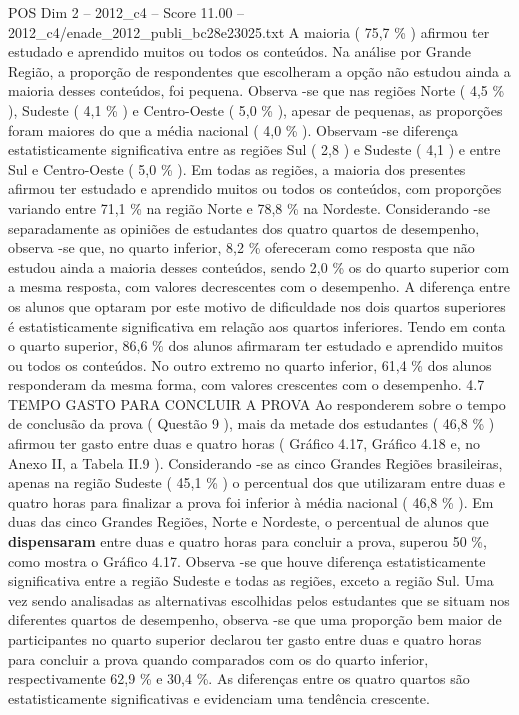 \begin{textsample}{POS Dim 2 – 2012\_c4 – Score 11.00 – 2012\_c4/enade\_2012\_publi\_bc28e23025.txt}
A maioria ( 75,7 \% ) afirmou ter estudado e aprendido muitos ou todos os conteúdos.
Na análise por Grande Região, a proporção de respondentes que escolheram a opção não estudou ainda a maioria desses conteúdos, foi pequena.
Observa -se que nas regiões Norte ( 4,5 \% ), Sudeste ( 4,1 \% ) e Centro-Oeste ( 5,0 \% ), apesar de pequenas, as proporções foram maiores do que a média nacional ( 4,0 \% ).
Observam -se diferença estatisticamente significativa entre as regiões Sul ( 2,8 ) e Sudeste ( 4,1 ) e entre Sul e Centro-Oeste ( 5,0 \% ).
Em todas as regiões, a maioria dos presentes afirmou ter estudado e aprendido muitos ou todos os conteúdos, com proporções variando entre 71,1 \% na região Norte e 78,8 \% na Nordeste.
Considerando -se separadamente as opiniões de estudantes dos quatro quartos de desempenho, observa -se que, no quarto inferior, 8,2 \% ofereceram como resposta que não estudou ainda a maioria desses conteúdos, sendo 2,0 \% os do quarto superior com a mesma resposta, com valores decrescentes com o desempenho.
A diferença entre os alunos que optaram por este motivo de dificuldade nos dois quartos superiores é estatisticamente significativa em relação aos quartos inferiores.
Tendo em conta o quarto superior, 86,6 \% dos alunos afirmaram ter estudado e aprendido muitos ou todos os conteúdos.
No outro extremo no quarto inferior, 61,4 \% dos alunos responderam da mesma forma, com valores crescentes com o desempenho. 4.7 TEMPO GASTO PARA CONCLUIR A PROVA Ao responderem sobre o tempo de conclusão da prova ( Questão 9 ), mais da metade dos estudantes ( 46,8 \% ) afirmou ter gasto entre duas e quatro horas ( Gráfico 4.17, Gráfico 4.18 e, no Anexo II, a Tabela II.9 ).
Considerando -se as cinco Grandes Regiões brasileiras, apenas na região Sudeste ( 45,1 \% ) o percentual dos que utilizaram entre duas e quatro horas para finalizar a prova foi inferior à média nacional ( 46,8 \% ).
Em duas das cinco Grandes Regiões, Norte e Nordeste, o percentual de alunos que \textbf{dispensaram} entre duas e quatro horas para concluir a prova, superou 50 \%, como mostra o Gráfico 4.17.
Observa -se que houve diferença estatisticamente significativa entre a região Sudeste e todas as regiões, exceto a região Sul.
Uma vez sendo analisadas as alternativas escolhidas pelos estudantes que se situam nos diferentes quartos de desempenho, observa -se que uma proporção bem maior de participantes no quarto superior declarou ter gasto entre duas e quatro horas para concluir a prova quando comparados com os do quarto inferior, respectivamente 62,9 \% e 30,4 \%.
As diferenças entre os quatro quartos são estatisticamente significativas e evidenciam uma tendência crescente.

\end{textsample}
